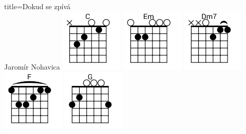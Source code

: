 \begin{song}{title=\predtitle\centering Dokud se zpívá \\\large Jaromír Nohavica  \vspace*{-0.3cm}}
\centering
\includegraphics[width=3cm]{../Akordy/c}
\includegraphics[width=3cm]{../Akordy/em}
\includegraphics[width=3cm]{../Akordy/dm7}
\includegraphics[width=3cm]{../Akordy/f}
\includegraphics[width=3cm]{../Akordy/g}

\setcounter{Slokočet}{0}
\end{song}
